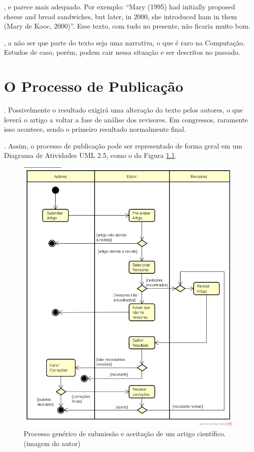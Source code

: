 \documentclass[openany]{book}
\begin{document}
, e parece mais adequado. Por exemplo: ``Mary (1995) had initially proposed cheese and bread sandwiches, but later, in 2000, she introduced ham in them (Mary de Kooc, 2000)''. Esse texto, com tudo no presente, não ficaria muito bom.

, a não ser que parte do texto seja uma narrativa, o que é raro na Computação. Estudos de caso, porém, podem cair nessa situação e ser descritos no passado.

\chapter{O Processo de Publicação}

. Possivelmente o resultado exigirá uma alteração do texto pelos autores, o que leverá o artigo a voltar a fase de análise dos revisores. Em congressos, raramente isso acontece, sendo o primeiro resultado normalmente final.

. Assim, o processo de publicação pode ser representado de forma geral em um Diagrama de Atividades UML 2.5, como o da Figura \ref{fig:processo}.


\begin{figure}
    \centering
    \includegraphics[width=0.7\linewidth]{imagens/ProcessoDeSubmissao.png}
    \caption[Processo genérico de submissão e aceitação de um artigo científico]{Processo genérico de submissão e aceitação de um artigo científico. (imagem do autor)}
    \label{fig:processo}
\end{figure}
\end{document}
